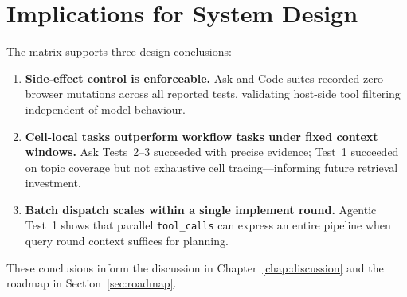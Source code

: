 \section{Implications for System Design}
\label{sec:results-design}

The matrix supports three design conclusions:

\begin{enumerate}
  \item \textbf{Side-effect control is enforceable.} Ask and Code suites recorded zero browser mutations across all reported tests, validating host-side tool filtering independent of model behaviour.
  \item \textbf{Cell-local tasks outperform workflow tasks under fixed context windows.} Ask Tests~2--3 succeeded with precise evidence; Test~1 succeeded on topic coverage but not exhaustive cell tracing---informing future retrieval investment.
  \item \textbf{Batch dispatch scales within a single implement round.} Agentic Test~1 shows that parallel \texttt{tool\_calls} can express an entire pipeline when query round context suffices for planning.
\end{enumerate}

These conclusions inform the discussion in Chapter~\ref{chap:discussion} and the roadmap in Section~\ref{sec:roadmap}.
